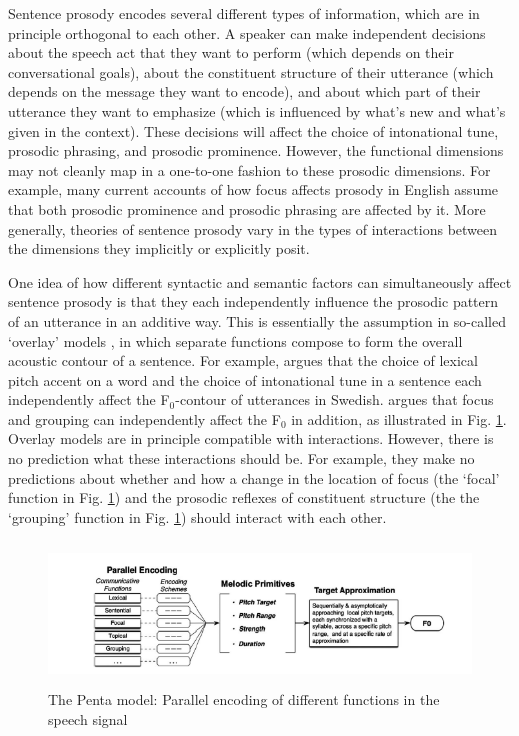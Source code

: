 \documentclass[preprint,review,12pt,authoryear,times]{elsarticle}
\begin{document}
Sentence prosody encodes several different types of information, which are in principle orthogonal to each other. A speaker can make independent decisions about the speech act that they want to perform (which depends on their conversational goals), about the constituent structure of their utterance (which depends on the message they want to encode), and about which part of their utterance they want to emphasize (which is influenced by what's new and what's given in the context). These decisions will affect the choice of intonational tune, prosodic phrasing, and prosodic prominence. However, the functional dimensions may not cleanly map in a one-to-one fashion to these prosodic dimensions. For example, many current accounts of how focus affects prosody in English assume that both prosodic prominence and prosodic phrasing are affected by it. More generally, theories of sentence prosody vary in the types of interactions between the dimensions they implicitly or explicitly posit. 
 
One idea of how different syntactic and semantic factors can simultaneously affect sentence prosody is that they each independently influence the prosodic pattern of an utterance in an additive way. This is essentially the assumption in so-called `overlay' models \citep{ohman67,fujis81,mobiu93,baill05,xu05,geraz18}, in which separate functions compose to form the overall acoustic contour of a sentence. For example, \citet{ohman67} argues that the choice of lexical pitch accent on a word and the choice of intonational tune in a sentence each independently affect the F$_0$-contour of utterances in Swedish. \citet{xu05} argues that focus and grouping can independently affect the F$_0$  in addition, as illustrated in Fig. \ref{figPenta}. Overlay models are in principle compatible with interactions. However, there is no prediction what these interactions should be. For example, they make no predictions about whether and how a change in the location of focus (the `focal' function in Fig. \ref{figPenta}) and the prosodic reflexes of constituent structure (the the `grouping' function in Fig. \ref{figPenta}) should interact with each other.


\begin{figure}[!ht]
	\begin{center}
		\includegraphics[height=1.5in]{Figures/penta.png}
		\caption{The Penta model: Parallel encoding of different functions in the speech signal \citep[from][]{xu05}}
	\end{center}
	\label{figPenta}
\end{figure}
\end{document}
